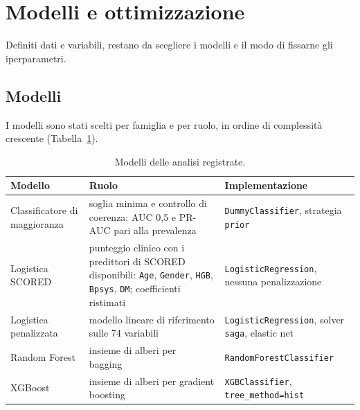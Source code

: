 \documentclass[a4paper, 12pt, oneside]{book}
\begin{document}
\section{Modelli e ottimizzazione}

Definiti dati e variabili, restano da scegliere i modelli e il modo di fissarne gli iperparametri.

\subsection{Modelli}

I modelli sono stati scelti per famiglia e per ruolo, in ordine di complessità crescente (Tabella~\ref{tab:modelli}).

\begin{table}[H]
	\centering
	\small
	\caption{Modelli delle analisi registrate.}
	\label{tab:modelli}
	\begin{tabularx}{\textwidth}{@{}>{\raggedright\arraybackslash}p{3cm} >{\raggedright\arraybackslash}X >{\raggedright\arraybackslash}p{3.6cm}@{}}
		\toprule
		Modello & Ruolo & Implementazione \\
		\midrule
		Classificatore di maggioranza & soglia minima e controllo di coerenza: AUC 0,5 e PR-AUC pari alla prevalenza & \texttt{DummyClassifier}, strategia \texttt{prior} \\
		Logistica SCORED & punteggio clinico con i predittori di SCORED~\cite{bang_screening_2007} disponibili: \texttt{Age}, \texttt{Gender}, \texttt{HGB}, \texttt{Bpsys}, \texttt{DM}; coefficienti ristimati & \texttt{LogisticRegression}, nessuna penalizzazione \\
		Logistica penalizzata & modello lineare di riferimento sulle 74 variabili & \texttt{LogisticRegression}, solver \texttt{saga}, elastic net \\
		Random Forest & insieme di alberi per bagging~\cite{breiman_random_2001} & \texttt{RandomForestClassifier} \\
		XGBoost & insieme di alberi per gradient boosting~\cite{chen_xgboost_2016} & \texttt{XGBClassifier}, \texttt{tree\_method=hist} \\
		\bottomrule
	\end{tabularx}
\end{table}
\end{document}
